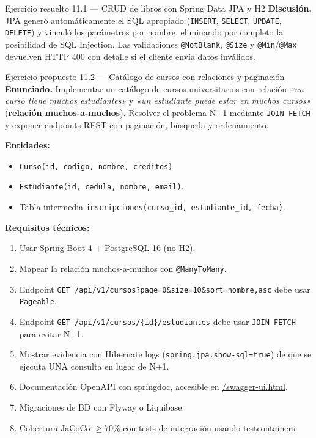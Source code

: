\begin{cajaejemplo}{Ejercicio resuelto 11.1 --- CRUD de libros con Spring Data JPA y H2}
\textbf{Discusión.} JPA generó automáticamente el SQL apropiado
(\texttt{INSERT}, \texttt{SELECT}, \texttt{UPDATE}, \texttt{DELETE})
y vinculó los parámetros por nombre, eliminando por completo la
posibilidad de SQL Injection. Las validaciones \texttt{@NotBlank},
\texttt{@Size} y \texttt{@Min}/\texttt{@Max} devuelven HTTP 400 con
detalle si el cliente envía datos inválidos.
\end{cajaejemplo}

\begin{cajaejercicio}{Ejercicio propuesto 11.2 --- Catálogo de cursos con relaciones y paginación}
\textbf{Enunciado.} Implementar un catálogo de cursos universitarios
con relación \emph{«un curso tiene muchos estudiantes»} y
\emph{«un estudiante puede estar en muchos cursos»} (\textbf{relación
muchos-a-muchos}). Resolver el problema N+1 mediante \texttt{JOIN
FETCH} y exponer endpoints REST con paginación, búsqueda y
ordenamiento.

\textbf{Entidades:}
\begin{itemize}
\item \texttt{Curso(id, codigo, nombre, creditos)}.
\item \texttt{Estudiante(id, cedula, nombre, email)}.
\item Tabla intermedia \texttt{inscripciones(curso\_id, estudiante\_id, fecha)}.
\end{itemize}

\textbf{Requisitos técnicos:}
\begin{enumerate}
\item Usar Spring Boot 4 + PostgreSQL 16 (no H2).
\item Mapear la relación muchos-a-muchos con \texttt{@ManyToMany}.
\item Endpoint \texttt{GET /api/v1/cursos?page=0\&size=10\&sort=nombre,asc}
debe usar \texttt{Pageable}.
\item Endpoint \texttt{GET /api/v1/cursos/\{id\}/estudiantes} debe
usar \texttt{JOIN FETCH} para evitar N+1.
\item Mostrar evidencia con Hibernate logs (\texttt{spring.jpa.show-sql=true})
de que se ejecuta UNA consulta en lugar de N+1.
\item Documentación OpenAPI con springdoc, accesible en
\url{/swagger-ui.html}.
\item Migraciones de BD con Flyway o Liquibase.
\item Cobertura JaCoCo $\geq 70\%$ con tests de integración usando
testcontainers.
\end{enumerate}


\end{cajaejercicio}
